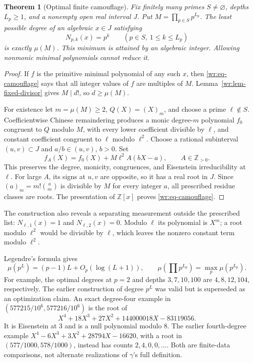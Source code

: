\documentclass[11pt,a4paper]{article}
\newcommand{\Z}{\mathbb Z}
\newtheorem{theorem}{Theorem}[section]
\theoremstyle{definition}
\theoremstyle{remark}
\numberwithin{equation}{section}
\begin{document}
\begin{theorem}[Optimal finite camouflage]\label{wr:thm-camouflage}
Fix finitely many primes \(S\ne\varnothing\), depths \(L_p\ge1\), and
a nonempty open real interval \(J\). Put \(M=\prod_{p\in S}p^{L_p}\). The least
possible degree of an algebraic \(x\in J\) satisfying
\begin{equation}\label{wr:eq-camouflage}
 N_{p,k}(x)=p^k\qquad(p\in S,\ 1\le k\le L_p)
\end{equation}
is exactly \(\mu(M)\). This minimum is attained by an algebraic integer.
Allowing nonmonic minimal polynomials cannot reduce it.
\end{theorem}
\begin{proof}
If \(f\) is the primitive minimal polynomial of any such \(x\), then
\eqref{wr:eq-camouflage} says that all integer values of \(f\) are
multiples of \(M\). Lemma~\ref{wr:lem-fixed-divisor} gives \(M\mid d!\),
so \(d\ge\mu(M)\).

For existence let \(m=\mu(M)\ge2\), \(Q(X)=(X)_m\), and choose a prime
\(\ell\notin S\). Coefficientwise Chinese remaindering produces a
monic degree-\(m\) polynomial \(f_0\) congruent to \(Q\) modulo \(M\),
with every lower coefficient divisible by \(\ell\), and constant
coefficient congruent to \(\ell\) modulo \(\ell^2\). Choose a rational
subinterval \((u,v)\subset J\) and \(a/b\in(u,v)\), \(b>0\). Set
\[
 f_A(X)=f_0(X)+M\ell^2 A(bX-a),\qquad A\in\Z_{>0}.
\]
This preserves the degree, monicity, congruences, and Eisenstein
irreducibility at \(\ell\). For large \(A\), its signs at \(u,v\) are
opposite, so it has a real root in \(J\). Since
\((a)_m=m!\binom am\) is divisible by \(M\) for every integer \(a\),
all prescribed residue classes are roots. The presentation of
\(\Z[x]\) proves \eqref{wr:eq-camouflage}.
\end{proof}

The construction also reveals a separating measurement outside the
prescribed list: \(N_{\ell,1}(x)=1\) and \(N_{\ell,2}(x)=0\).
Modulo \(\ell\) its polynomial is \(X^m\); a root modulo \(\ell^2\)
would be divisible by \(\ell\), which leaves the nonzero constant term
modulo \(\ell^2\).

Legendre's formula gives
\[
 \mu(p^L)=(p-1)L+O_p(\log(L+1)),\qquad
 \mu\!\left(\prod p^{L_p}\right)=\max_p\mu(p^{L_p}).
\]
For example, the optimal degrees at \(p=2\) and depths \(3,7,10,100\)
are \(4,8,12,104\), respectively. The earlier construction of degree
\(p^L\) was valid but is superseded as an optimization claim.
An exact degree-four example in
\((577215/10^6,577216/10^6)\) is the root of
\[
 X^4+18X^3+27X^2+144000018X-83119056.
\]
It is Eisenstein at 3 and is a null polynomial modulo 8. The earlier
fourth-degree example
\(X^4-6X^3+3X^2+28794X-16620\), with a root in
\((577/1000,578/1000)\), instead has counts \(2,4,0,0,\ldots\).
Both are finite-data comparisons, not alternate realizations of
\(\gamma\)'s full definition.
\end{document}
